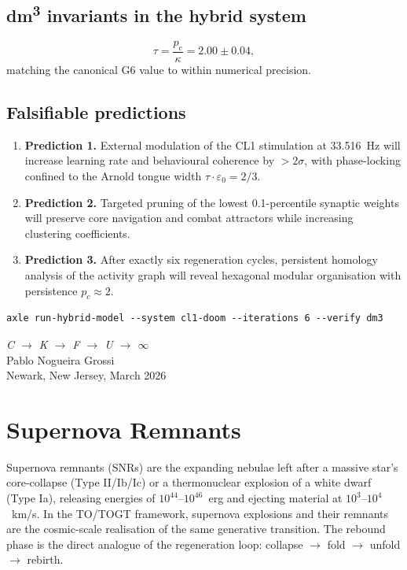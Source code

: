 \section{dm\textsuperscript{3} invariants in the hybrid system}

\[
\tau = \frac{p_c}{\kappa} = 2.00 \pm 0.04,
\]
matching the canonical G6 value to within numerical precision.

\section{Falsifiable predictions}

\begin{enumerate}
\item \textbf{Prediction 1.} External modulation of the CL1 stimulation at 33.516~Hz will increase learning rate and behavioural coherence by $> 2\sigma$, with phase-locking confined to the Arnold tongue width $\tau \cdot \varepsilon_0 = 2/3$.
\item \textbf{Prediction 2.} Targeted pruning of the lowest 0.1-percentile synaptic weights will preserve core navigation and combat attractors while increasing clustering coefficients.
\item \textbf{Prediction 3.} After exactly six regeneration cycles, persistent homology analysis of the activity graph will reveal hexagonal modular organisation with persistence $p_c \approx 2$.
\end{enumerate}

\begin{verbatim}
axle run-hybrid-model --system cl1-doom --iterations 6 --verify dm3
\end{verbatim}

\bigskip
\begin{flushright}
\textit{C \;$\to$\; K \;$\to$\; F \;$\to$\; U \;$\to$\; $\infty$}\\[0.3em]
Pablo Nogueira Grossi\\
Newark, New Jersey, March 2026
\end{flushright}

\chapter{Supernova Remnants}

Supernova remnants (SNRs) are the expanding nebulae left after a massive star's core-collapse (Type II/Ib/Ic) or a thermonuclear explosion of a white dwarf (Type Ia), releasing energies of $10^{44}$--$10^{46}$~erg and ejecting material at $10^3$--$10^4$~km/s. In the TO/TOGT framework, supernova explosions and their remnants are the cosmic-scale realisation of the same generative transition. The rebound phase is the direct analogue of the regeneration loop: collapse $\to$ fold $\to$ unfold $\to$ rebirth.

